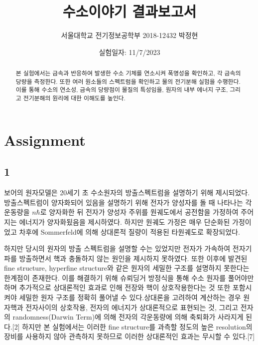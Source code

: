 \documentclass[%
 reprint,
 amsmath,amssymb,
 aps,
]{revtex4-2}
\begin{document}
\title{수소이야기 결과보고서}

\author{서울대학교 전기정보공학부 2018-12432 박정현}
\date{실험일자: 11/7/2023}%

\begin{abstract}
본 실험에서는 금속과 반응하여 발생한 수소 기체를 연소시켜 폭명성을 확인하고, 각 금속의 당량을 측정한다. 또한 여러 원소들의 스펙트럼을 확인하고 물의 전기분해 실험을 수행한다. 이를 통해 수소의 연소성, 금속의 당량점이 물질의 특성임을, 원자의 내부 에너지 구조, 그리고 전기분해의 원리에 대한 이해도를 높인다.
\end{abstract}

\maketitle


\section{\label{sec:level1}Assignment}
\subsection{\label{sec:level2}1}
보어의 원자모델은 20세기 초 수소원자의 방출스펙트럼을 설명하기 위해 제시되었다. 방출스펙트럼이 양자화되어 있음을 설명하기 위해 전자가 양성자를 돌 때 나타나는 각운동량을 $n\hbar$로 양자화한 뒤 전자가 양성자 주위를 원궤도에서 공전함을 가정하여 주어지는 에너지가 양자화됬음을 제시하였다. 하지만 원궤도 가정은 매우 단순화된 가정이었고 차후에 Sommerfeld에 의해 상대론적 질량이 적용된 타원궤도로 확장되었다.

하지만 당시의 원자의 방출 스펙트럼을 설명할 수는 있었지만 전자가 가속하여 전자기파를 방출하면서 핵과 충돌하지 않는 원인을 제시하지 못하였다. 또한 이후에 발견된 fine structure, hyperfine structure와 같은 원자의 세밀한 구조를 설명하지 못한다는 한계점이 존재한다. 이를 해결하기 위해 슈뢰딩거 방정식을 통해 수소 원자를 풀어야만 하며 추가적으로 상대론적인 효과로 인해 전장와 핵이 상호작용한다는 것 또한 포함시켜야 세밀한 원자 구조를 정확히 풀어낼 수 있다.상대론을 고려하여 계산하는 경우 원자핵과 전자사이의 상호작용, 전자의 에너지가 상대론적으로 표현되는 것, 그리고 전자의 randomness(Darwin Term)에 의해 전자의 각운동량에 의해 축퇴화가 사라지게 된다.[2] 하지만 본 실험에서는 이러한 fine structure를 과측할 정도의 높은 resolution의 장비를 사용하지 않아 관측하지 못하므로 이러한 상대론적인 효과는 무시할 수 있다.[7]
\end{document}
